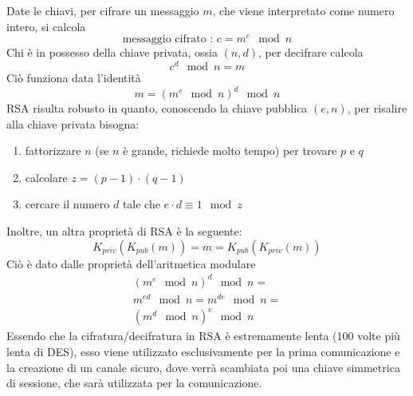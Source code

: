 \documentclass[12pt, letterpaper]{article}
\begin{document}
Date le chiavi, per cifrare un messaggio $m$, che viene interpretato come numero intero, si calcola 
$$ \text{messaggio cifrato : } c = m^e \mod{n}$$
Chi è in possesso della chiave privata, ossia $(n,d)$, per decifrare calcola $$ c^d\mod{n}=m$$
Ciò funziona data l'identità $$ m=(m^e \mod{n})^d \mod{n}$$
RSA risulta robusto in quanto, conoscendo la chiave pubblica $(e,n)$, per risalire alla chiave privata bisogna:\begin{enumerate}
    \item fattorizzare $n$ (se $n$ è grande, richiede molto tempo) per trovare $p$ e $q$
    \item calcolare $z=(p-1)\cdot(q-1)$
    \item cercare il numero $d$ tale che $e\cdot d \equiv 1 \mod{z}$
\end{enumerate}
Inoltre, un altra proprietà di RSA è la seguente: 
$$K_{priv}(K_{pub}(m))= m =K_{pub}(K_{priv}(m))$$
Ciò è dato dalle proprietà dell'aritmetica modulare 
$$\begin{matrix} (m^e \mod{n})^d \mod{n} =\\ m^{ed} \mod{n} = m^{de} \mod{n} =\\ (m^d \mod{n})^e \mod{n}\end{matrix}$$
Essendo che la cifratura/decifratura in RSA è estremamente lenta (100 volte più lenta di DES), esso viene utilizzato 
esclusivamente per la prima comunicazione e la creazione di un canale sicuro, dove verrà scambiata poi una 
chiave simmetrica di sessione, che sarà utilizzata per la comunicazione.
\end{document}
